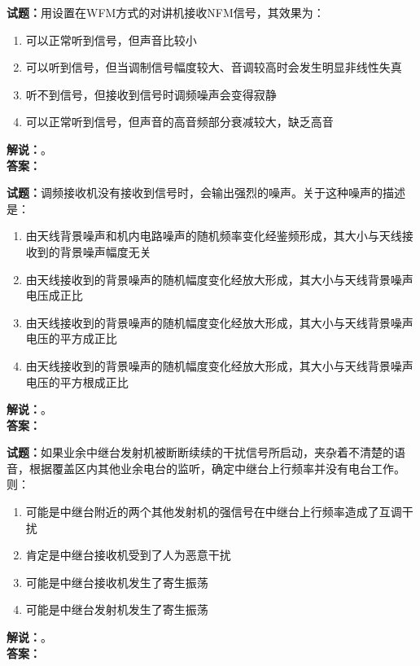 \documentclass{ctexbook}
\begin{document}
\bigskip




\noindent\textbf{试题：}用设置在WFM方式的对讲机接收NFM信号，其效果为：
\begin{enumerate}[leftmargin=3em]
\item 可以正常听到信号，但声音比较小
\item 可以听到信号，但当调制信号幅度较大、音调较高时会发生明显非线性失真
\item 听不到信号，但接收到信号时调频噪声会变得寂静
\item 可以正常听到信号，但声音的高音频部分衰减较大，缺乏高音
\end{enumerate}
\noindent\textbf{解说：}\textbf{}。\\\noindent\textbf{答案：}

\bigskip




\noindent\textbf{试题：}调频接收机没有接收到信号时，会输出强烈的噪声。关于这种噪声的描述是：
\begin{enumerate}[leftmargin=3em]
\item 由天线背景噪声和机内电路噪声的随机频率变化经鉴频形成，其大小与天线接收到的背景噪声幅度无关
\item 由天线接收到的背景噪声的随机幅度变化经放大形成，其大小与天线背景噪声电压成正比
\item 由天线接收到的背景噪声的随机幅度变化经放大形成，其大小与天线背景噪声电压的平方成正比
\item 由天线接收到的背景噪声的随机幅度变化经放大形成，其大小与天线背景噪声电压的平方根成正比
\end{enumerate}
\noindent\textbf{解说：}\textbf{}。\\\noindent\textbf{答案：}

\bigskip




\noindent\textbf{试题：}如果业余中继台发射机被断断续续的干扰信号所启动，夹杂着不清楚的语音，根据覆盖区内其他业余电台的监听，确定中继台上行频率并没有电台工作。则：
\begin{enumerate}[leftmargin=3em]
\item 可能是中继台附近的两个其他发射机的强信号在中继台上行频率造成了互调干扰
\item 肯定是中继台接收机受到了人为恶意干扰
\item 可能是中继台接收机发生了寄生振荡
\item 可能是中继台发射机发生了寄生振荡
\end{enumerate}
\noindent\textbf{解说：}\textbf{}。\\\noindent\textbf{答案：}
\end{document}
